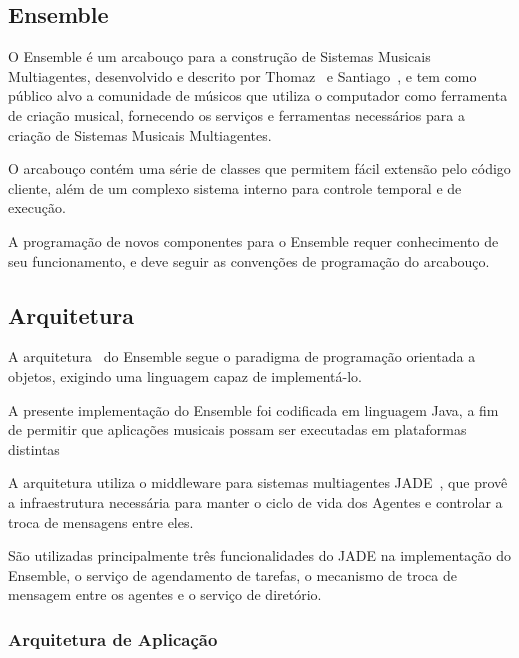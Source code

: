 \documentclass[a4paper, 11pt, twoside]{article}
\begin{document}
\begin{multicols}{2}

\section{Ensemble}

O Ensemble é um arcabouço para a construção de Sistemas Musicais Multiagentes, 
desenvolvido e descrito por Thomaz~\cite{leandro11} e 
Santiago~\cite{santiago12}, e tem como público alvo a comunidade de músicos que
utiliza o computador como ferramenta de criação musical, fornecendo os serviços
e ferramentas necessários para a criação de Sistemas Musicais Multiagentes. 

O arcabouço contém uma série de classes que permitem fácil extensão pelo
código cliente, além de um complexo sistema interno para
controle temporal e de execução.

A programação de novos componentes para o Ensemble requer conhecimento de seu 
funcionamento, e deve seguir as convenções de programação do arcabouço. 

\subsection{Arquitetura}

A arquitetura~\cite{leandro11} do Ensemble segue o paradigma de programação 
orientada a objetos, exigindo uma linguagem capaz de implementá-lo.

A presente implementação do Ensemble foi codificada em linguagem Java, a fim de
permitir que aplicações musicais possam ser executadas em plataformas distintas

A arquitetura utiliza o middleware para sistemas multiagentes JADE~\cite{belli99}, 
que provê a infraestrutura necessária para manter o ciclo de vida dos Agentes e
controlar a troca de mensagens entre eles.

São utilizadas principalmente três funcionalidades do JADE na implementação do
Ensemble, o serviço de agendamento de tarefas, o mecanismo de troca de mensagem
entre os agentes e o serviço de diretório.

\subsubsection{Arquitetura de Aplicação}


\end{multicols}
\end{document}

